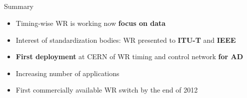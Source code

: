 \documentclass[compress,red]{beamer}
\begin{document}
\subsection{}
\begin{frame}{Summary}


    \begin{itemize}
      \item Timing-wise WR is working now \textbf{focus on data}
      \item Interest of standardization bodies: WR presented to \textbf{ITU-T} and \textbf{IEEE}
      \item \textbf{First deployment} at CERN of WR timing and control network \textbf{for AD}
      \item Increasing number of applications
      \item First commercially available WR switch by the end of 2012

    \end{itemize}    

 
\end{frame}
\end{document}
